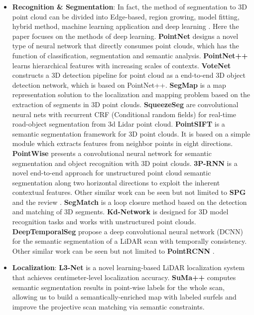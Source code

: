 \documentclass[journal,transmag]{IEEEtran}
\begin{document}
\begin{itemize}
    \item \textbf{Recognition \& Segmentation}: In fact, the method of segmentation to 3D point cloud can be divided into Edge-based, region growing, model fitting, hybrid method, machine learning application and deep learning \cite{grilli2017review}. Here the paper focuses on the methods of deep learning. \textbf{PointNet} \cite{qi2016pointnet} designs a novel type of neural network that directly consumes point clouds, which has the function of classification, segmentation and semantic analysis. \textbf{PointNet++} \cite{qi2017pointnetplusplus} learns hierarchical features with increasing scales of contexts. \textbf{VoteNet} \cite{qi2019deep} constructs a 3D detection pipeline for point cloud as a end-to-end 3D object detection network, which is based on PointNet++. \textbf{SegMap} \cite{segmap2018} is a map representation solution to the localization and mapping problem based on the extraction of segments in 3D point clouds. \textbf{SqueezeSeg} \cite{wu2017squeezeseg}\cite{wu2018squeezesegv2}\cite{yue2018lidar} are convolutional neural nets with recurrent CRF (Conditional random fields) for real-time road-object segmentation from 3d Lidar point cloud. \textbf{PointSIFT} \cite{jiang2018pointsift} is a semantic segmentation framework for 3D point clouds. It is based on a simple module which extracts features from neighbor points in eight directions. \textbf{PointWise} \cite{hua-pointwise-cvpr18} presents a convolutional neural network for semantic segmentation and object recognition with 3D point clouds. \textbf{3P-RNN} \cite{ye20183d} is a novel end-to-end approach for unstructured point cloud semantic segmentation along two horizontal directions to exploit the inherent contextual features. Other similar work can be seen but not limited to \textbf{SPG} \cite{landrieu2018large} and the review \cite{grilli2017review}. \textbf{SegMatch} \cite{dube2017segmatch} is a loop closure method based on the detection and matching of 3D segments. \textbf{Kd-Network}  \cite{klokov2017escape} is designed for 3D model recognition tasks and works with unstructured point clouds. \textbf{DeepTemporalSeg} \cite{dewan2019deeptemporalseg} propose a deep convolutional neural network (DCNN) for the semantic segmentation of a LiDAR scan with temporally consistency. Other similar work can be seen but not limited to \textbf{PointRCNN} \cite{shi2019pointrcnn}.
    \item \textbf{Localization}:  \textbf{L3-Net} \cite{L3-Net} is a novel learning-based LiDAR localization system that achieves centimeter-level localization accuracy. \textbf{SuMa++} \cite{Chen2019suma} computes semantic segmentation results in point-wise labels for the whole scan, allowing us to build a semantically-enriched map with labeled surfels and  improve the projective scan matching via semantic constraints.
\end{itemize}
\end{document}
